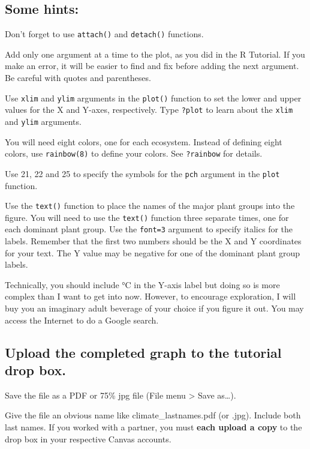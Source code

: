 \documentclass[11pt]{article}
\begin{document}
\subsection*{Some hints:}

Don't forget to use \texttt{attach()} and \texttt{detach()} functions.

Add only one argument at a time to the plot, as you
did in the R Tutorial. If you make an error, it will be easier to find and fix
before adding the next argument. Be careful with quotes and parentheses.

Use \texttt{xlim} and \texttt{ylim} arguments in the \texttt{plot()} function to set the lower and
upper values for the X and Y-axes, respectively. Type \texttt{?plot} to learn about
the \texttt{xlim} and \texttt{ylim} arguments.

You will need eight colors, one for each ecosystem. Instead of defining
eight colors, use \texttt{rainbow(8)} to define your colors. See \texttt{?rainbow} for
details.

Use 21, 22 and 25 to specify the symbols for the \texttt{pch} argument in the
\texttt{plot} function.

Use the \texttt{text()} function to place the names of the major plant groups
into the figure. You will need to use the \texttt{text()} function
three separate times, one for each dominant plant group. Use the \texttt{font=3}
argument to specify italics for the labels. Remember that the first two
numbers should be the X and Y coordinates for your text. The Y value may
be negative for one of the dominant plant group labels.

Technically, you should include °C in the Y-axis label but doing so is
more complex than I want to get into now. However, to encourage
exploration, I will buy you an imaginary adult beverage of your choice if %
you figure it out. You may access the Internet to do a Google search.

\subsection*{Upload the completed graph to the tutorial drop box.}

Save the file as a PDF or 75\% jpg file (File menu \textgreater{} Save
as\ldots{}).

Give the file an obvious name like climate\_lastnames.pdf (or .jpg).
Include both last names. If you worked with a partner, you must \textbf{each upload a
copy} to the drop box in your respective Canvas accounts.
\end{document}
